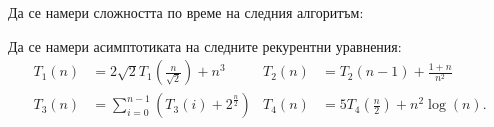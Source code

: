 \begin{problem}
Да се намери сложността по време на следния алгоритъм:

\end{problem}

\begin{problem}
Да се намери асимптотиката на следните рекурентни уравнения:
\begin{align*}
    T_1(n) & = 2 \sqrt{2} T_1\left(\frac{n}{\sqrt{2}}\right) + n^3              & T_2(n) & = T_2(n - 1) + \frac{1 + n}{n^2}               \\
    T_3(n) & = \sum\limits_{i = 0}^{n - 1}\left(T_3(i) + 2^{\frac{n}{2}}\right) & T_4(n) & = 5 T_4\left(\frac{n}{2}\right) + n^2 \log(n).
\end{align*}
\end{problem}
